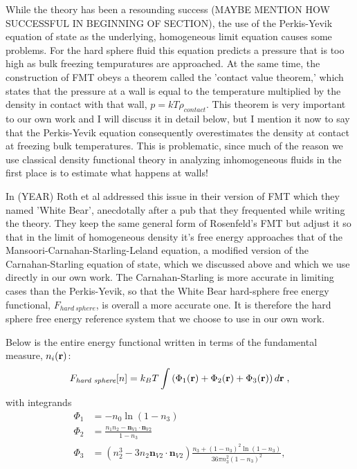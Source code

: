 While the theory has been a resounding success (MAYBE MENTION HOW
SUCCESSFUL IN BEGINNING OF SECTION), the use of the Perkis-Yevik
equation of state as the underlying, homogeneous limit equation causes
some problems.  For the hard sphere fluid this equation predicts a
pressure that is too high as bulk freezing tempuratures are
approached.  At the same time, the construction of FMT obeys a theorem
called the 'contact value theorem,' which states that the pressure at
a wall is equal to the temperature multiplied by the density in
contact with that wall, $p=kT\rho_{contact}$.  This theorem is very
important to our own work and I will discuss it in detail below, but I
mention it now to say that the Perkis-Yevik equation consequently
overestimates the density at contact at freezing bulk temperatures.
This is problematic, since much of the reason we use classical density
functional theory in analyzing inhomogeneous fluids in the first place
is to estimate what happens at walls!

In (YEAR) Roth et al addressed this issue in their version of FMT
which they named 'White Bear', anecdotally after a pub that they
frequented while writing the theory.  They keep the same general form
of Rosenfeld's FMT but adjust it so that in the limit of homogeneous
density it's free energy approaches that of the
Mansoori-Carnahan-Starling-Leland equation, a modified version of the
Carnahan-Starling equation of state, which we discussed above and
which we use directly in our own work.  The Carnahan-Starling is more
accurate in limiting cases than the Perkis-Yevik, so that the White
Bear hard-sphere free energy functional, $F_{hard~sphere}$, is overall
a more accurate one.  It is therefore the hard sphere free energy
reference system that we choose to use in our own work.

Below is the entire energy functional written in terms of the
fundamental measure, $n_i(\textbf{r})$:
\begin{equation}
F_\textit{hard~sphere}[n] = k_B T \int \left(\Phi_1(\textbf{r}) + \Phi_2(\textbf{r}) + \Phi_3(\textbf{r})\right) d\textbf{r} \; ,
\end{equation}
with integrands
\begin{align}
\Phi_1 &= -n_0 \ln\left( 1 - n_3\right) \label{eq:Phi1}\\
\Phi_2 &= \frac{n_1 n_2 - \mathbf{n}_{V1} \cdot\mathbf{n}_{V2}}{1-n_3} \\
\Phi_3 &= (n_2^3 - 3 n_2 \mathbf{n}_{V2} \cdot \mathbf{n}_{V2}) \frac{
  n_3 + (1-n_3)^2 \ln(1-n_3)
}{
  36\pi n_3^2\left( 1 - n_3 \right)^2
} , \label{eq:Phi3}
\end{align}


